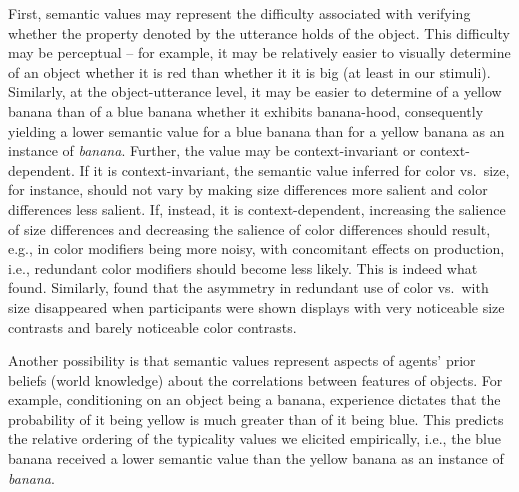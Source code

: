 \documentclass[11pt]{article}
\begin{document}
First, semantic values may  represent the difficulty associated with verifying whether the property denoted by the utterance holds of the object. This difficulty may be perceptual -- for example, it may be relatively easier to visually determine of an object whether it is red than whether it it is big (at least in our stimuli). Similarly, at the object-utterance level, it may be easier to determine of a yellow banana than of a blue banana whether it exhibits banana-hood,  consequently yielding a lower semantic value for a blue banana than for a yellow banana as an instance of \emph{banana}. Further, the value may be context-invariant or context-dependent. If it is context-invariant, the semantic value inferred for color vs.~size, for instance, should not vary by making size differences more salient and color differences less salient. If, instead, it is context-dependent, increasing the salience of size differences and decreasing the salience of color differences should result, e.g.,  in  color modifiers being more noisy, with concomitant effects on production, i.e., redundant color modifiers should become less likely. This is indeed what  found. Similarly,  found that the asymmetry in redundant use of color vs.~with size disappeared when participants were shown displays with very noticeable size contrasts and barely noticeable color contrasts.

Another possibility is that semantic values represent aspects of agents' prior beliefs (world knowledge) about the correlations between features of objects. For example, conditioning on an object being a banana, experience dictates that the probability of it being yellow is much greater than of it being blue. This predicts the relative ordering of the typicality values we elicited empirically, i.e., the blue banana received a lower semantic value than the yellow banana as an instance of \emph{banana}.  
\end{document}
